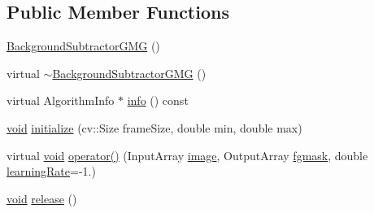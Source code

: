 \subsection*{Public Member Functions}
\begin{DoxyCompactItemize}
\item 
\hyperlink{classcv_1_1BackgroundSubtractorGMG_a6caec4b272e7b548fb105a03e3461ce0}{Background\-Subtractor\-G\-M\-G} ()
\item 
virtual \hyperlink{classcv_1_1BackgroundSubtractorGMG_ab04198d6ac332f4fce2e79cb01e73e60}{$\sim$\-Background\-Subtractor\-G\-M\-G} ()
\item 
virtual Algorithm\-Info $\ast$ \hyperlink{classcv_1_1BackgroundSubtractorGMG_ab964ae424066bf14960615ae903153a3}{info} () const 
\item 
\hyperlink{legacy_8hpp_a8bb47f092d473522721002c86c13b94e}{void} \hyperlink{classcv_1_1BackgroundSubtractorGMG_a4e89d03c902993623d1138bbb2a5bced}{initialize} (cv\-::\-Size frame\-Size, double min, double max)
\item 
virtual \hyperlink{legacy_8hpp_a8bb47f092d473522721002c86c13b94e}{void} \hyperlink{classcv_1_1BackgroundSubtractorGMG_a4c7920883f20e3af2c2125b846a276f2}{operator()} (Input\-Array \hyperlink{legacy_8hpp_ad62b16ab219ae2483e8a3d921c44cc97}{image}, Output\-Array \hyperlink{classcv_1_1BackgroundSubtractor_a3a04333e20f88e6799f368d7abb2abd9}{fgmask}, double \hyperlink{classcv_1_1BackgroundSubtractorGMG_ab573842c1b123e8ad99fe84a03f877b7}{learning\-Rate}=-\/1.)
\item 
\hyperlink{legacy_8hpp_a8bb47f092d473522721002c86c13b94e}{void} \hyperlink{classcv_1_1BackgroundSubtractorGMG_acb52ba29800dd9b5359718fcb0e7bd8d}{release} ()
\end{DoxyCompactItemize}
